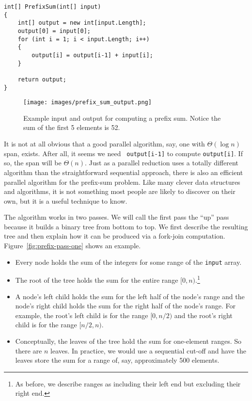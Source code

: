 \documentclass[10pt]{article}
\begin{document}
\begin{verbatim}
int[] PrefixSum(int[] input)
{
    int[] output = new int[input.Length];
    output[0] = input[0];
    for (int i = 1; i < input.Length; i++)
    {
        output[i] = output[i-1] + input[i];
    }

    return output;
}
\end{verbatim}

\begin{figure}
\begin{center}
\texttt{[image: images/prefix\_sum\_output.png]}
\end{center}
\caption{Example input and output for computing a prefix sum.  Notice
  the sum of the first 5 elements is 52.}
\label{fig:prefix_sum_output}
\end{figure}


It is not at all obvious that a good parallel algorithm, say, one with
$\Theta(\log n)$ span, exists.  After all, it seems we need {\tt
  output[i-1]} to compute {\tt output[i]}.  If so, the span will be
$\Theta(n)$.  Just as a parallel reduction uses a totally different
algorithm than the straightforward sequential approach, there is also
an efficient parallel algorithm for the prefix-sum problem.  Like many
clever data structures and algorithms, it is not something most people
are likely to discover on their own, but it is a useful technique
to know.

The algorithm works in two passes.  We will call the first pass the
``up'' pass because it builds a binary tree from bottom to top.  We
first describe the resulting tree and then explain how it can be
produced via a fork-join computation.
Figure~\ref{fig:prefix-pass-one} shows an example.
\begin{itemize}
\item Every node holds the sum of the integers for some range of the
  {\tt input} array.
\item The root of the tree holds the sum for the entire range 
  $[0,n)$.\footnote{As before, we describe ranges as including their left
  end but excluding their right end.}
\item A node's left child holds the sum for the left half of the
  node's range and the node's right child holds the sum for the right
  half of the node's range.  For example, the root's left child is for
  the range $[0,n/2)$ and the root's right child is for the range
  $[n/2,n)$.
\item Conceptually, the leaves of the tree hold the sum for
  one-element ranges.  So there are $n$ leaves.  In practice, we would
  use a sequential cut-off and have the leaves store the sum for a
  range of, say, approximately 500 elements.
\end{itemize}
\end{document}
